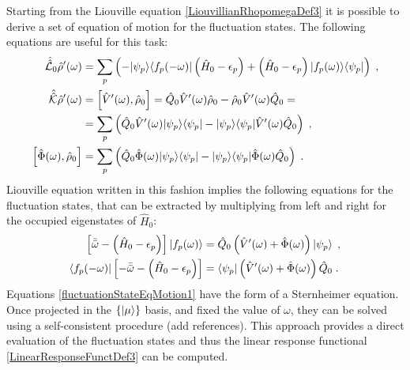 \documentclass[a4paper]{article}
\newcommand{\eps}{\epsilon}
\newcommand{\bomega}{\bar\omega}
\newcommand{\bbomega}{\bar{\bomega}}
\newcommand{\nn}{\notag}
\newcommand{\lb}{\label}
\newcommand{\op}[1]{\hat {#1}}
\newcommand{\sop}[1]{\op{\op {#1}}}
\newcommand{\commutator}[2]{\left[ {#1} , {#2} \right]}
\newcommand{\ketbra}[2]{| #1 \rangle \langle #2 |}
\newcommand{\dmnot}{\op{\rho}_0}
\newcommand{\dm}{\op{\rho}}
\newcommand{\hnot}{\op{H}_0}
\newcommand{\Liouvnot}{\sop{\mathcal L_0}}
\newcommand{\coupl}{\sop{\mathcal K}}
\begin{document}
Starting from the Liouville equation \eqref{LiouvillianRhopomegaDef3} it is possible to derive a set of equation of motion for the fluctuation states. 
The following equations are useful for this task: 
\begin{align}
\Liouvnot\dm'(\omega) & = \sum_p\left(-\ketbra{\psi_p}{f_p(-\omega)}\left(\hnot-\eps_p\right) + \left(\hnot-\eps_p\right)\ketbra{f_p(\omega)}{\psi_p}\right) \;, \nn \\
\coupl\dm'(\omega) &= \commutator{\op V'(\omega)}{\dmnot} = \op Q_0 \op V'(\omega) \dmnot - \dmnot \op V'(\omega) \op Q_0 = \nn \\
& = \sum_p\left( \op Q_0 \op V'(\omega) \ketbra{\psi_p}{\psi_p} - \ketbra{\psi_p}{\psi_p} \op V'(\omega) \op Q_0 \right) \;, \nn \\
\commutator{\op \Phi(\omega)}{\dmnot} & =  \sum_p\left( \op Q_0 \op \Phi(\omega) \ketbra{\psi_p}{\psi_p} - \ketbra{\psi_p}{\psi_p} \op \Phi(\omega) \op Q_0 \right) \;. \nn
\end{align} 
Liouville equation written in this fashion implies the following equations for the fluctuation states, that can be extracted by multiplying from left and right for the 
occupied eigenstates of $\hnot$:
\begin{align}\lb{fluctuationStateEqMotion1}
\left[\bbomega - \left(\hnot-\eps_p\right)\right]\ket{f_p(\omega)} &= \op Q_0\left(\op V'(\omega) + \op \Phi(\omega)\right)\ket{\psi_p} \;, \nn \\
\bra{f_p(-\omega)}\left[-\bbomega - \left(\hnot-\eps_p\right)\right] &= \bra{\psi_p}\left(\op V'(\omega) + \op \Phi(\omega)\right)\op Q_0 \;.
\end{align}
Equations \eqref{fluctuationStateEqMotion1} have the form of a Sternheimer equation. Once projected in the $\{\ket{\mu}\}$ basis, and fixed the value of $\omega$, they can be solved 
using a self-consistent procedure (add references). This approach provides a direct evaluation of the fluctuation states and thus the linear response functional \eqref{LinearResponseFunctDef3}
can be computed.
\end{document}
